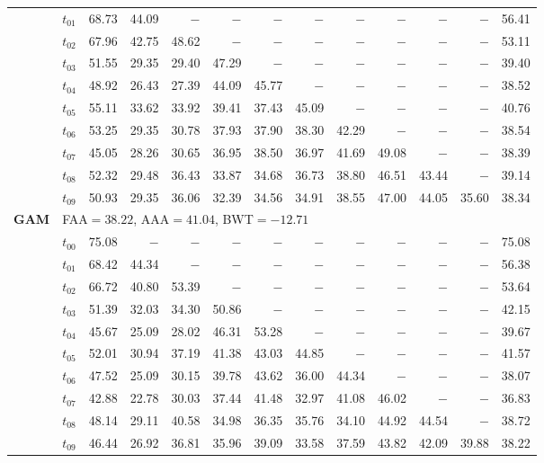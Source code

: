 \begin{table}[ht]
\begin{tabular}{@{}l l r r r r r r r r r r r@{}}
 & $t_{01}$ & 68.73 & 44.09 & $-$ & $-$ & $-$ & $-$ & $-$ & $-$ & $-$ & $-$ & 56.41 \\
 & $t_{02}$ & 67.96 & 42.75 & 48.62 & $-$ & $-$ & $-$ & $-$ & $-$ & $-$ & $-$ & 53.11 \\
 & $t_{03}$ & 51.55 & 29.35 & 29.40 & 47.29 & $-$ & $-$ & $-$ & $-$ & $-$ & $-$ & 39.40 \\
 & $t_{04}$ & 48.92 & 26.43 & 27.39 & 44.09 & 45.77 & $-$ & $-$ & $-$ & $-$ & $-$ & 38.52 \\
 & $t_{05}$ & 55.11 & 33.62 & 33.92 & 39.41 & 37.43 & 45.09 & $-$ & $-$ & $-$ & $-$ & 40.76 \\
 & $t_{06}$ & 53.25 & 29.35 & 30.78 & 37.93 & 37.90 & 38.30 & 42.29 & $-$ & $-$ & $-$ & 38.54 \\
 & $t_{07}$ & 45.05 & 28.26 & 30.65 & 36.95 & 38.50 & 36.97 & 41.69 & 49.08 & $-$ & $-$ & 38.39 \\
 & $t_{08}$ & 52.32 & 29.48 & 36.43 & 33.87 & 34.68 & 36.73 & 38.80 & 46.51 & 43.44 & $-$ & 39.14 \\
 & $t_{09}$ & 50.93 & 29.35 & 36.06 & 32.39 & 34.56 & 34.91 & 38.55 & 47.00 & 44.05 & 35.60 & 38.34 \\
\midrule
\multirow{11}{*}{\textbf{GAM}} & \multicolumn{12}{l}{\quad\small FAA$=38.22$,\; AAA$=41.04$,\; BWT$=-12.71$} \\
 & $t_{00}$ & 75.08 & $-$ & $-$ & $-$ & $-$ & $-$ & $-$ & $-$ & $-$ & $-$ & 75.08 \\
 & $t_{01}$ & 68.42 & 44.34 & $-$ & $-$ & $-$ & $-$ & $-$ & $-$ & $-$ & $-$ & 56.38 \\
 & $t_{02}$ & 66.72 & 40.80 & 53.39 & $-$ & $-$ & $-$ & $-$ & $-$ & $-$ & $-$ & 53.64 \\
 & $t_{03}$ & 51.39 & 32.03 & 34.30 & 50.86 & $-$ & $-$ & $-$ & $-$ & $-$ & $-$ & 42.15 \\
 & $t_{04}$ & 45.67 & 25.09 & 28.02 & 46.31 & 53.28 & $-$ & $-$ & $-$ & $-$ & $-$ & 39.67 \\
 & $t_{05}$ & 52.01 & 30.94 & 37.19 & 41.38 & 43.03 & 44.85 & $-$ & $-$ & $-$ & $-$ & 41.57 \\
 & $t_{06}$ & 47.52 & 25.09 & 30.15 & 39.78 & 43.62 & 36.00 & 44.34 & $-$ & $-$ & $-$ & 38.07 \\
 & $t_{07}$ & 42.88 & 22.78 & 30.03 & 37.44 & 41.48 & 32.97 & 41.08 & 46.02 & $-$ & $-$ & 36.83 \\
 & $t_{08}$ & 48.14 & 29.11 & 40.58 & 34.98 & 36.35 & 35.76 & 34.10 & 44.92 & 44.54 & $-$ & 38.72 \\
 & $t_{09}$ & 46.44 & 26.92 & 36.81 & 35.96 & 39.09 & 33.58 & 37.59 & 43.82 & 42.09 & 39.88 & 38.22 \\

\end{tabular}
\end{table}
